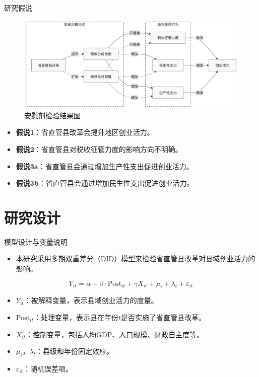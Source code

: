 \documentclass{beamer}
\newcommand{\tightlist}{%
  \setlength{\itemsep}{0pt}\setlength{\parskip}{0pt}}
\begin{document}
\begin{frame}{研究假说}
\label{ux7814ux7a76ux5047ux8bf4}
\begin{figure}
    \centering
    \includegraphics[width=\textwidth]{pic/图1-理论框架图.png} 
    \caption{安慰剂检验结果图}
\end{figure}

\begin{itemize}
\tightlist
\item
  \textbf{假说1}：省直管县改革会提升地区创业活力。
\item
  \textbf{假说2}：省直管县对税收征管力度的影响方向不明确。
\item
  \textbf{假说3a}：省直管县会通过增加生产性支出促进创业活力。
\item
  \textbf{假说3b}：省直管县会通过增加民生性支出促进创业活力。
\end{itemize}
\end{frame}

\section{研究设计}\label{ux7814ux7a76ux8bbeux8ba1}

\begin{frame}{模型设计与变量说明}
\label{ux6a21ux578bux8bbeux8ba1ux4e0eux53d8ux91cfux8bf4ux660e}
\begin{itemize}
\tightlist
\item
  本研究采用多期双重差分（DID）模型来检验省直管县改革对县域创业活力的影响。
\end{itemize}

\[
Y_{it} = \alpha + \beta \cdot \text{Post}_{it} + \gamma X_{it} + \mu_i + \lambda_t + \varepsilon_{it}
\]

\begin{itemize}
\tightlist
\item
  \(Y_{it}\)：被解释变量，表示县域创业活力的度量。
\item
  \(\text{Post}_{it}\)：处理变量，表示县在年份\(t\)是否实施了省直管县改革。
\item
  \(X_{it}\)：控制变量，包括人均GDP、人口规模、财政自主度等。
\item
  \(\mu_i\)，\(\lambda_t\)：县级和年份固定效应。
\item
  \(\varepsilon_{it}\)：随机误差项。
\end{itemize}
\end{frame}
\end{document}
